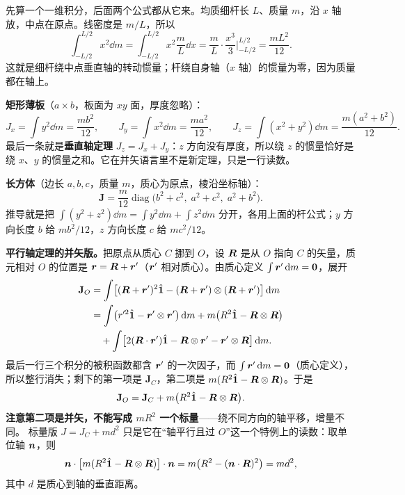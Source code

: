\documentclass[11pt]{ctexart}
\newcommand{\ten}[1]{\mathbf{#1}}
\newcommand{\unitd}{\hat{\ten{1}}}
\let\origsubhdr\subhdr
\renewcommand{\subhdr}[1]{\par\needspace{3\baselineskip}\origsubhdr{#1}}
\begin{document}

先算一个一维积分，后面两个公式都从它来。均质细杆长 $L$、质量 $m$，沿 $x$ 轴放，中点在原点。线密度是 $m/L$，所以
\[
\int_{-L/2}^{L/2}x^2\dd m
=\int_{-L/2}^{L/2}x^2\frac{m}{L}\dd x
=\frac{m}{L}\cdot\frac{x^3}{3}\Big|_{-L/2}^{L/2}
=\frac{mL^2}{12}.
\]
这就是细杆绕中点垂直轴的转动惯量；杆绕自身轴（$x$ 轴）的惯量为零，因为质量都在轴上。

\textbf{矩形薄板}（$a\times b$，板面为 $xy$ 面，厚度忽略）：
\[
J_x=\int y^2\dd m=\frac{mb^2}{12},\qquad
J_y=\int x^2\dd m=\frac{ma^2}{12},\qquad
J_z=\int(x^2+y^2)\dd m=\frac{m(a^2+b^2)}{12}.
\]
最后一条就是\textbf{垂直轴定理} $J_z=J_x+J_y$：$z$ 方向没有厚度，所以绕 $z$ 的惯量恰好是绕 $x$、$y$ 的惯量之和。它在并矢语言里不是新定理，只是一行读数。

\textbf{长方体}（边长 $a,b,c$，质量 $m$，质心为原点，棱沿坐标轴）：
\[
\ten J=\frac{m}{12}\operatorname{diag}\bigl(b^2+c^2,\;a^2+c^2,\;a^2+b^2\bigr).
\]
推导就是把 $\int(y^2+z^2)\dd m=\int y^2\dd m+\int z^2\dd m$ 分开，各用上面的杆公式；$y$ 方向长度 $b$ 给 $mb^2/12$，$z$ 方向长度 $c$ 给 $mc^2/12$。

\textbf{平行轴定理的并矢版。}把原点从质心 $C$ 挪到 $O$，设 $\boldsymbol{R}$ 是从 $O$ 指向 $C$ 的矢量，质元相对 $O$ 的位置是 $\boldsymbol{r}=\boldsymbol{R}+\boldsymbol{r}'$（$\boldsymbol{r}'$ 相对质心）。由质心定义 $\int\boldsymbol{r}'\,\mathrm{d} m=\boldsymbol{0}$，展开
\[
\begin{aligned}
\ten J_O&=\int\bigl[(\vect R+\vect r')^2\unitd-(\vect R+\vect r')\otimes(\vect R+\vect r')\bigr]\dd m\\
&=\int\bigl(r'^2\unitd-\vect r'\otimes\vect r'\bigr)\dd m
+m\bigl(R^2\unitd-\vect R\otimes\vect R\bigr)\\
&\quad+\int\bigl[2(\vect R\cdot\vect r')\unitd-\vect R\otimes\vect r'-\vect r'\otimes\vect R\bigr]\dd m .
\end{aligned}
\]
最后一行三个积分的被积函数都含 $\boldsymbol{r}'$ 的一次因子，而 $\int\boldsymbol{r}'\,\mathrm{d} m=\boldsymbol{0}$（质心定义），所以整行消失；剩下的第一项是 $\ten J_C$，第二项是 $m(R^2\unitd-\vect R\otimes\vect R)$。于是
\[
\ten J_O=\ten J_C+m\bigl(R^2\unitd-\vect R\otimes\vect R\bigr).
\]
\textbf{注意第二项是并矢，不能写成 $mR^2$ 一个标量}——绕不同方向的轴平移，增量不同。
标量版 $J=J_C+md^2$ 只是它在“轴平行且过 $O$”这一个特例上的读数：取单位轴 $\boldsymbol{n}$，则
\[
\vect n\cdot\bigl[m(R^2\unitd-\vect R\otimes\vect R)\bigr]\cdot\vect n
=m\bigl(R^2-(\vect n\cdot\vect R)^2\bigr)=m d^2,
\]
其中 $d$ 是质心到轴的垂直距离。
\end{document}
